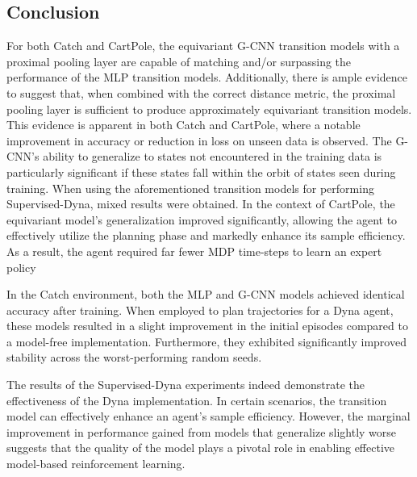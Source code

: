 \subsection{Conclusion}
For both Catch and CartPole, the equivariant G-CNN transition models with a proximal pooling layer are capable of matching and/or surpassing the performance of the MLP transition models. Additionally, there is ample evidence to suggest that, when combined with the correct distance metric, the proximal pooling layer is sufficient to produce approximately equivariant transition models. This evidence is apparent in both Catch and CartPole, where a notable improvement in accuracy or reduction in loss on unseen data is observed. The G-CNN's ability to generalize to states not encountered in the training data is particularly significant if these states fall within the orbit of states seen during training.
When using the aforementioned transition models for performing Supervised-Dyna, mixed results were obtained. In the context of CartPole, the equivariant model's generalization improved significantly, allowing the agent to effectively utilize the planning phase and markedly enhance its sample efficiency. As a result, the agent required far fewer MDP time-steps to learn an expert policy

In the Catch environment, both the MLP and G-CNN models achieved identical accuracy after training. When employed to plan trajectories for a Dyna agent, these models resulted in a slight improvement in the initial episodes compared to a model-free implementation. Furthermore, they exhibited significantly improved stability across the worst-performing random seeds.

The results of the Supervised-Dyna experiments indeed demonstrate the effectiveness of the Dyna implementation. In certain scenarios, the transition model can effectively enhance an agent's sample efficiency. However, the marginal improvement in performance gained from models that generalize slightly worse suggests that the quality of the model plays a pivotal role in enabling effective model-based reinforcement learning. %

